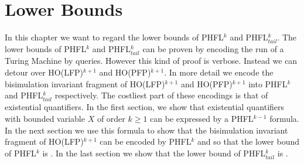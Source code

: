 
\chapter{Lower Bounds}\label{ch:lowerBounds}

In this chapter we want to regard the lower bounds of PHFL$^k$ and PHFL$^k_{tail}$. The lower bounds of PHFL$^k$ and
PHFL$^k_{tail}$ can be proven by encoding the run of a Turing Machine by queries. However this kind of proof is
verbose. Instead we can detour over HO(LFP)$^{k+1}$ and HO(PFP)$^{k+1}$. In more detail we encode the bisimulation
invariant fragment of HO(LFP)$^{k+1}$ and HO(PFP)$^{k+1}$ into PHFL$^k$ and PHFL$^k_{tail}$ respectively. The
costliest part of these encodings is that of existential quantifiers. In the first section, we show that existential
quantifiers with bounded variable $X$ of order $k \geq 1$ can be expressed by a PHFL$^{k-1}$ formula. In the next
section we use this formula to show that the bisimulation invariant fragment of HO(LFP)$^{k+1}$ can be encoded by
PHFL$^k$ and so that the lower bound of PHFL$^k$ is . In the last section we show that the lower bound
of PHFL$^k_{tail}$ is .






